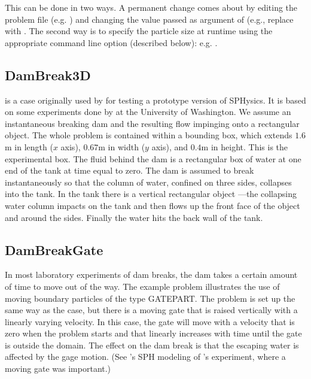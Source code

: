 \documentclass[12pt]{memoir}
\begin{document}
This can be done in two ways. A permanent change comes about by editing
the problem file (e.g. ) and changing the value
passed as argument of  (e.g., replace
 with . The second way
is to specify the particle size at runtime using the appropriate command
line option (described below): e.g. .

\subsection{DamBreak3D}

 is a case originally used by
\cite{gomez-gesteira_using_2004}
for testing a prototype version of SPHysics. It is based on some
experiments done by \cite{arnason_interactions_2005} at the University of Washington.
We assume an instantaneous breaking dam and the resulting flow impinging
onto a rectangular object. The whole problem is contained within a
bounding box, which extends $1.6$m in length ($x$ axis), $0.67$m in
width ($y$ axis), and $0.4$m in height. This is the experimental box.
The fluid behind the dam is a rectangular box of water at one end of the
tank at time equal to zero. The dam is assumed to break instantaneously
so that the column of water, confined on three sides, collapses into the
tank. In the tank there is a vertical rectangular object ---the
collapsing water column impacts on the tank and then flows up the front
face of the object and around the sides. Finally the water hits the back
wall of the tank.

\subsection{DamBreakGate}

In most laboratory experiments of dam breaks, the dam takes a certain
amount of time to move out of the way. The example problem
 illustrates the use of moving boundary particles of
the type GATEPART. The problem is set up the same way as the
 case, but there is a moving gate that is raised
vertically with a linearly varying velocity. In this case, the gate will
move with a velocity that is zero when the problem starts and that
linearly increases with time until the gate is outside the domain. The
effect on the dam break is that the escaping water is affected by the
gage motion. (See \cite{crespo_modeling_2008}'s SPH modeling of
\cite{janosi_turbulent_2004}'s experiment, where a moving gate was important.)
\end{document}
